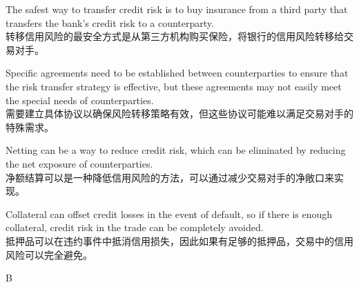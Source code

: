 \documentclass{article}
\begin{document}
                \begin{choices}
                    \item The safest way to transfer credit risk is to buy insurance from a third party that transfers the bank's credit risk to a counterparty.\\
                    转移信用风险的最安全方式是从第三方机构购买保险，将银行的信用风险转移给交易对手。
                    \item Specific agreements need to be established between counterparties to ensure that the risk transfer strategy is effective, but these agreements may not easily meet the special needs of counterparties.\\
                    需要建立具体协议以确保风险转移策略有效，但这些协议可能难以满足交易对手的特殊需求。
                    \item Netting can be a way to reduce credit risk, which can be eliminated by reducing the net exposure of counterparties.\\
                    净额结算可以是一种降低信用风险的方法，可以通过减少交易对手的净敞口来实现。
                    \item Collateral can offset credit losses in the event of default, so if there is enough collateral, credit risk in the trade can be completely avoided.\\
                    抵押品可以在违约事件中抵消信用损失，因此如果有足够的抵押品，交易中的信用风险可以完全避免。
                \end{choices}
                
                \begin{correctanswer}
                B
                \end{correctanswer}
                
\end{document}
